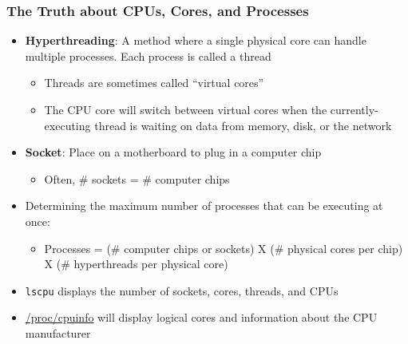\documentclass[hyperref,pdfa,unicode,utf8,usepdftitle]{beamer}
\begin{document}
\begin{frame}
  \frametitle{The Truth about CPUs, Cores, and Processes}
  \begin{itemize}
  \item \textbf{Hyperthreading}: A method where a single physical core can
    handle multiple processes. Each process is called a thread
    \begin{itemize}
    \item Threads are sometimes called ``virtual cores''
    \item The CPU core will switch between virtual cores when the
      currently-executing thread is waiting on data from memory, disk,
      or the network
    \end{itemize}
  \item \textbf{Socket}: Place on a motherboard to plug in a computer
    chip
    \begin{itemize}
    \item Often, \# sockets = \# computer chips
    \end{itemize}
  \item Determining the maximum number of processes that can be
    executing at once:
    \begin{itemize}
    \item Processes = (\# computer chips or sockets) X (\# physical
      cores per chip) X (\# hyperthreads per physical core)
    \end{itemize}
  \item \lstinline{lscpu} displays the number of sockets, cores,
    threads, and CPUs
  \item \url{/proc/cpuinfo} will display logical cores and information
    about the CPU manufacturer
  \end{itemize}
\end{frame}
\end{document}
